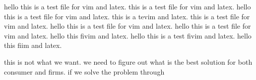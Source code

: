 \documentclass{article}
\begin{document}
\begin{spacing}{1.5}
hello this is a test file for vim and latex.
this is a test file for vim and latex.
hello this is a test file for vim and latex.
this is a tevim and latex.
this is a test file for vim and latex.
hello this is a test file for vim and latex.
hello this is a test file for vim and latex.
hello this fivim and latex.
hello this is a test fivim and latex.
hello this fiim and latex.

this is not what we want.
we need to figure out what is the best solution for both consumer and firms.
if we solve the problem through










\end{spacing}
\end{document}

